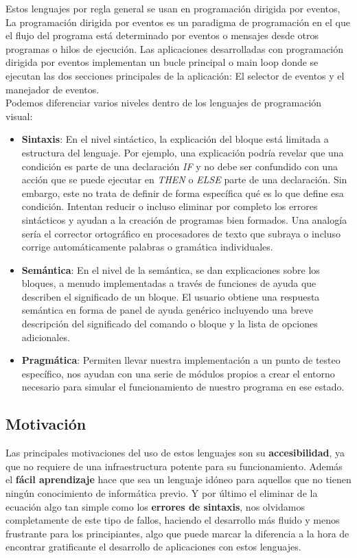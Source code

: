 Estos lenguajes por regla general se usan en programación dirigida por eventos, La programación dirigida por eventos es un paradigma de programación en el que el flujo del programa está determinado por eventos o mensajes desde otros programas o hilos de ejecución.
Las aplicaciones desarrolladas con programación dirigida por eventos implementan un bucle principal o main loop donde se ejecutan las dos secciones principales de la aplicación: El selector de eventos y el manejador de eventos.\\

Podemos diferenciar varios niveles dentro de los lenguajes de programación visual:
\begin{itemize}
\item \textbf{Sintaxis}: En el nivel sintáctico, la explicación del bloque está limitada a estructura del lenguaje. Por ejemplo, una explicación podría revelar que una condición es parte de una declaración \textit{IF} y no debe ser confundido con una acción que se puede ejecutar en \textit{THEN} o \textit{ELSE} parte de una declaración. Sin embargo, este no trata de definir de forma específica qué es lo que define esa condición.
Intentan reducir o incluso eliminar por completo los errores sintácticos y ayudan a la creación de programas bien formados. Una analogía sería el corrector ortográfico en procesadores de texto que subraya o incluso corrige automáticamente palabras o gramática individuales.

\item \textbf{Semántica}: En el nivel de la semántica, se dan explicaciones sobre los bloques, a menudo implementadas a través de funciones de ayuda que describen el significado
de un bloque. El usuario obtiene una respuesta semántica en forma de panel de ayuda genérico incluyendo una breve descripción del significado del comando o bloque y la lista de opciones adicionales.

\item \textbf{Pragmática}: Permiten llevar nuestra implementación a un punto de testeo específico, nos ayudan con una serie de módulos propios a crear el entorno necesario para simular el funcionamiento de nuestro programa en ese estado.
\end{itemize}

\subsection{Motivación}
\label{subsec:motivacion}

Las principales motivaciones del uso de estos lenguajes son su \textbf{accesibilidad}, ya que no requiere de una infraestructura potente para su funcionamiento.
Además el \textbf{fácil aprendizaje} hace que sea un lenguaje idóneo para aquellos que no tienen ningún conocimiento de informática previo.
Y por último el eliminar de la ecuación algo tan simple como los \textbf{errores de sintaxis}, nos olvidamos completamente de este tipo de fallos, haciendo el desarrollo más fluido y menos frustrante para los principiantes, algo que puede marcar la diferencia a la hora de encontrar gratificante el desarrollo de aplicaciones con estos lenguajes.

